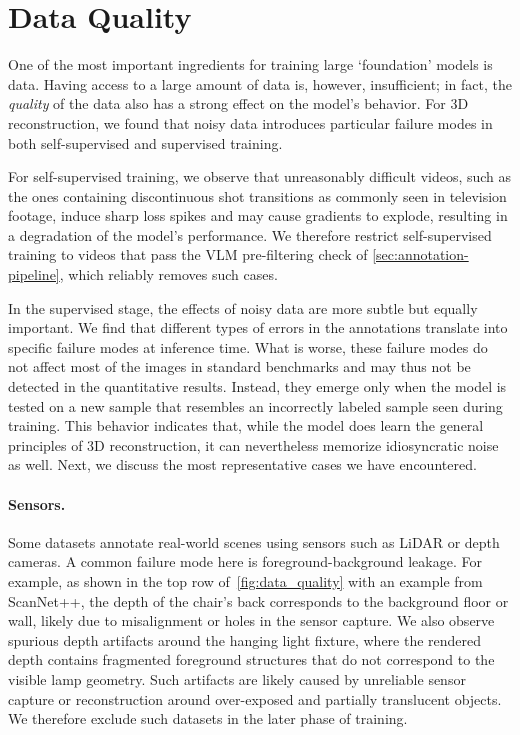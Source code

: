 \section{Data Quality}%
\label{sec:data_quality}

One of the most important ingredients for training large `foundation' models is data.
Having access to a large amount of data is, however, insufficient; in fact, the \emph{quality} of the data also has a strong effect on the model's behavior.
For 3D reconstruction, we found that noisy data introduces particular failure modes in both self-supervised and supervised training.

For self-supervised training, we observe that unreasonably difficult videos, such as the ones containing discontinuous shot transitions as commonly seen in television footage, induce sharp loss spikes and may cause gradients to explode, resulting in a degradation of the model's performance.
We therefore restrict self-supervised training to videos that pass the VLM pre-filtering check of \cref{sec:annotation-pipeline}, which reliably removes such cases.

In the supervised stage, the effects of noisy data are more subtle but equally important.
We find that different types of errors in the annotations translate into specific failure modes at inference time.
What is worse, these failure modes do not affect most of the images in standard benchmarks and may thus not be detected in the quantitative results.
Instead, they emerge only when the model is tested on a new sample that resembles an incorrectly labeled sample seen during training.
This behavior indicates that, while the model does learn the general principles of 3D reconstruction, it can nevertheless memorize idiosyncratic noise as well.
Next, we discuss the most representative cases we have encountered.



\paragraph{Sensors.}

Some datasets annotate real-world scenes using sensors such as LiDAR or depth cameras.
A common failure mode here is foreground-background leakage.
For example, as shown in the top row of~\cref{fig:data_quality} with an example from ScanNet++, the depth of the chair's back corresponds to the background floor or wall, likely due to misalignment or holes in the sensor capture.
We also observe spurious depth artifacts around the hanging light fixture, where the rendered depth contains fragmented foreground structures that do not correspond to the visible lamp geometry.
Such artifacts are likely caused by unreliable sensor capture or reconstruction around over-exposed and partially translucent objects.
We therefore exclude such datasets in the later phase of training.

